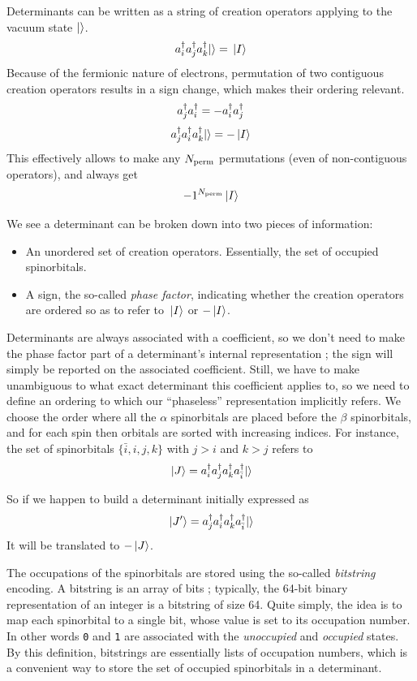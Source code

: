 Determinants can be written as a string of creation operators applying to the vacuum state ${\ket{}}$.
$$a^\dagger_{i} a^\dagger_{j} a^\dagger_{k} {\ket{}} = {\ket*{I}}$$
Because of the fermionic nature of electrons, permutation of two contiguous creation operators results in a sign change, which makes their ordering relevant.
$$a^\dagger_{j} a^\dagger_{i} = -a^\dagger_{i} a^\dagger_{j}$$
$$a^\dagger_{j} a^\dagger_{i} a^\dagger_{k} {\ket{}} = -{\ket*{I}}$$
This effectively allows to make any ${N_\text{perm}}$ permutations (even of non-contiguous operators), and always get
$$-1^{{N_\text{perm}}} {\ket*{I}}$$


We see a determinant can be broken down into two pieces of information:
\begin{itemize}
\item
An unordered set of creation operators. Essentially, the set of occupied spinorbitals.
\item
A sign, the so-called \emph{phase factor}, indicating whether the creation operators are ordered so as to refer to ${\ket*{I}}$ or $-{\ket*{I}}$.
\end{itemize}

Determinants are always associated with a coefficient, so we don't need to make the phase factor part of a determinant's internal representation ; the sign will simply be reported on the associated coefficient. Still, we have to make unambiguous to what exact determinant this coefficient applies to, so we need to define an ordering to which our ``phaseless'' representation implicitly refers. We choose the order where all the $\alpha$ spinorbitals are placed before the $\beta$ spinorbitals, and for each spin then orbitals are sorted with increasing indices.
For instance, the set of spinorbitals $\{\bar i, i,j,k \}$ with $j>i$ and $k>j$ refers to
$${\ket*{J}} = a^\dagger_{i} a^\dagger_{j} a^\dagger_{k} a^\dagger_{\bar i} {\ket{}} $$

So if we happen to build a determinant initially expressed as
$${\ket*{J'}} = a^\dagger_{j} a^\dagger_{i} a^\dagger_{k} a^\dagger_{\bar i} {\ket{}} $$
It will be translated to $-{\ket*{J}}$.


The occupations of the spinorbitals are stored using the so-called \emph{bitstring} encoding. A bitstring is an array of bits ; typically, the 64-bit binary representation of an integer is a bitstring of size 64.
Quite simply, the idea is to map each spinorbital to a single bit, whose value is set to its occupation number. In other words \texttt{0} and \texttt{1} are associated with the \emph{unoccupied} and \emph{occupied} states.
By this definition, bitstrings are essentially lists of occupation numbers, which is a convenient way to
store the set of occupied spinorbitals in a determinant.

